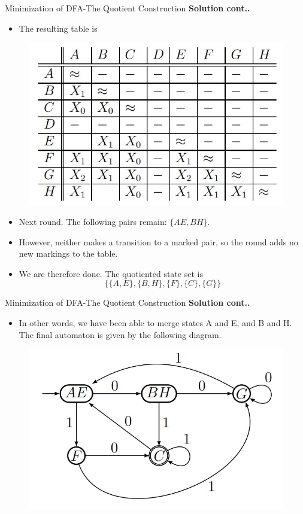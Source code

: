 \documentclass{beamer}
\begin{document}
\begin{frame}{Minimization of DFA-The Quotient Construction}
	\textbf{Solution cont..}
	\begin{itemize}
		\item The resulting table is
	\end{itemize}
\begin{figure}
	\includegraphics[scale=.4]{img2/m18}
\end{figure}
\begin{itemize}
	\item Next round. The following pairs remain: $\{AE, BH\}$. 
	\item However, neither
	makes a transition to a marked pair, so the round adds no new markings
	to the table. 
	\item We are therefore done. The quotiented state set is
	$$\{\{A,E\},\{B,H\},\{F\},\{C\},\{G\}\}$$
\end{itemize}
\end{frame}

\begin{frame}{Minimization of DFA-The Quotient Construction}
	\textbf{Solution cont..}
	\begin{itemize}
		\item In other words, we have been able to merge states A and E, and B and H.
		The final automaton is given by the following diagram.
	\end{itemize}
	\begin{figure}
		\includegraphics[scale=.4]{img2/m19}
	\end{figure}
\end{frame}
\end{document}
